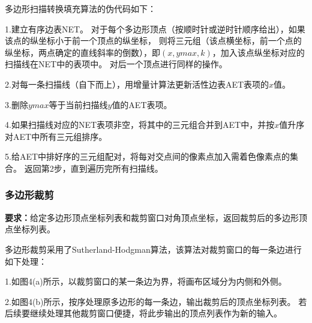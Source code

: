 \documentclass[a4paper,UTF8]{article}
\begin{document}
多边形扫描转换填充算法的伪代码如下：

1.建立有序边表NET。
对于每个多边形顶点（按顺时针或逆时针顺序给出），如果该点的纵坐标小于前一个顶点的纵坐标，
则将三元组（该点横坐标，前一个点的纵坐标，两点确定的直线斜率的倒数），即$(x,ymax,k)$，加入该点纵坐标对应的扫描线在NET中的表项中。
对后一个顶点进行同样的操作。

2.对每一条扫描线（自下而上），用增量计算法更新活性边表AET表项的$x$值。

3.删除$ymax$等于当前扫描线$y$值的AET表项。

4.如果扫描线对应的NET表项非空，将其中的三元组合并到AET中，并按$x$值升序对AET中所有三元组排序。

5.给AET中排好序的三元组配对，将每对交点间的像素点加入需着色像素点的集合。
返回第2步，直到遍历完所有扫描线。


\subsubsection{多边形裁剪}
\textbf{要求：}给定多边形顶点坐标列表和裁剪窗口对角顶点坐标，返回裁剪后的多边形顶点坐标列表。

多边形裁剪采用了Sutherland-Hodgman算法，该算法对裁剪窗口的每一条边进行如下处理：

1.如图4(a)所示，以裁剪窗口的某一条边为界，将画布区域分为内侧和外侧。

2.如图4(b)所示，按序处理原多边形的每一条边，输出裁剪后的顶点坐标列表。
若后续要继续处理其他裁剪窗口便捷，将此步输出的顶点列表作为新的输入。
\end{document}
